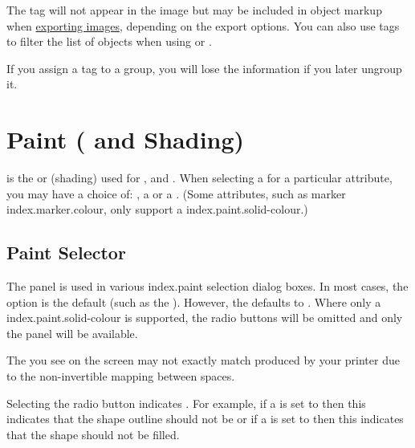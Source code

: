 The tag will not appear in the image but may be included in
object markup when \hyperref[sec:exportimage]{exporting images},
depending on the export options. You can also use tags to filter the
list of objects when using 
or .

\begin{important}
If you assign a tag to a \gls{group},
you will lose the information if you later ungroup it.
\end{important}

\chapter{Paint ( and Shading)}
\label{sec:paintcolourandshading}

 is the  or
 (shading) used for
,  and . When selecting a
 for a particular attribute, you may have a choice of:
, a  or a .
(Some attributes, such as marker \gls{index.marker.colour},
only support a \gls{index.paint.solid-colour}.)

\section{Paint Selector}\label{sec:paint}


The  panel is used in various \gls{index.paint}
selection dialog boxes.
In most cases, the  option is the default
(such as the ).  However, the
 defaults to .
Where only a \gls{index.paint.solid-colour} is supported, the radio
buttons will be omitted and only the  panel
will be available.

\begin{warning}
The  you see on the screen may not exactly match
 produced by your printer due to the non-invertible
mapping between  spaces.
\end{warning}


Selecting the  radio button indicates
. For example, if a  is set to
 then this indicates that the \gls{shape}
outline should not be  or if a
 is set to  then
this indicates that the \gls{shape} should not be filled.

